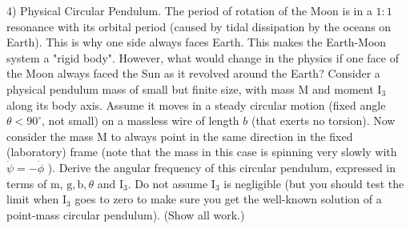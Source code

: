 \begin{problem}
	4) Physical Circular Pendulum.
The period of rotation of the Moon is in a $1: 1$ resonance with its orbital period (caused by tidal dissipation by the oceans on Earth). This is why one side always faces Earth. This makes the Earth-Moon system a "rigid body". However, what would change in the physics if one face of the Moon always faced the Sun as it revolved around the Earth?
Consider a physical pendulum mass of small but finite size, with mass $\mathrm{M}$ and moment $\mathrm{I}_3$ along its body axis. Assume it moves in a steady circular motion (fixed angle $\theta<90^{\circ}$, not small) on a massless wire of length $b$ (that exerts no torsion). Now consider the mass $\mathrm{M}$ to always point in the same direction in the fixed (laboratory) frame (note that the mass in this case is spinning very slowly with $\dot{\psi}=-\dot{\phi}$ ). Derive the angular frequency of this circular pendulum, expressed in terms of $\mathrm{m}$, $\mathrm{g}, \mathrm{b}, \theta$ and $\mathrm{I}_3$. Do not assume $\mathrm{I}_3$ is negligible (but you should test the limit when $\mathrm{I}_3$ goes to zero to make sure you get the well-known solution of a point-mass circular pendulum). (Show all work.)
\end{problem}
